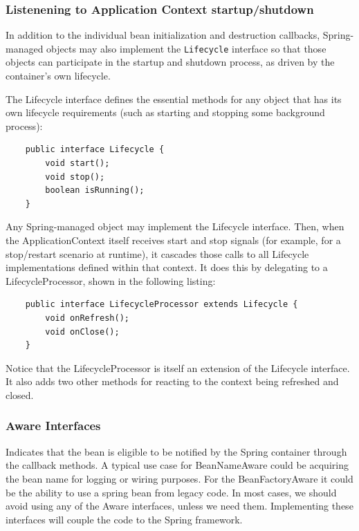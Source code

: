 \documentclass{scrartcl}
\begin{document}
\subsubsection{Listenening to Application Context startup/shutdown}

In addition to the individual bean initialization and destruction callbacks, Spring-managed objects may also
implement the \lstinline|Lifecycle| interface so that those objects can participate in the startup and shutdown
process, as driven by the container’s own lifecycle.

The Lifecycle interface defines the essential methods for any object that has its own lifecycle requirements (such as starting and stopping some background process):

\begin{lstlisting}
    public interface Lifecycle {
        void start();
        void stop();
        boolean isRunning();
    }
\end{lstlisting}

Any Spring-managed object may implement the Lifecycle interface.
Then, when the ApplicationContext itself receives start and stop signals (for example, for a stop/restart scenario at runtime), it cascades those calls to all Lifecycle implementations defined within that context. It
does this by delegating to a LifecycleProcessor, shown in the following listing:

\begin{lstlisting}
    public interface LifecycleProcessor extends Lifecycle {
        void onRefresh();
        void onClose();
    }
\end{lstlisting}

Notice that the LifecycleProcessor is itself an extension of the Lifecycle interface. It also adds two
other methods for reacting to the context being refreshed and closed.

\subsubsection{Aware Interfaces}

Indicates that the bean is eligible to be notified by the Spring container through the callback methods.
A typical use case for BeanNameAware could be acquiring the bean name for logging or wiring purposes. For the BeanFactoryAware it could be the ability to use a spring bean from legacy code.
In most cases, we should avoid using any of the Aware interfaces, unless we need them. Implementing these interfaces will couple the code to the Spring framework.
\end{document}
